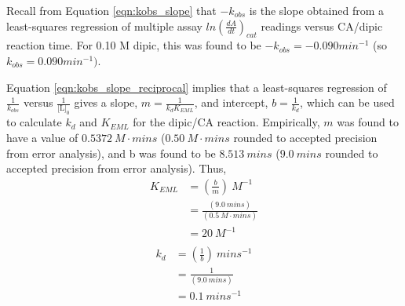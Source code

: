 Recall from Equation \eqref{eqn:kobs_slope} that $-k_{obs}$ is the slope obtained from a least-squares regression of multiple assay $ln \left(\frac{dA}{dt}\right)_{cat}$ readings versus CA/dipic reaction time. For 0.10 M dipic, this was found to be $-k_{obs}=-0.090 min^{-1}$ (so $k_{obs}=0.090 min^{-1})$.

Equation \eqref{eqn:kobs_slope_reciprocal} implies that a least-squares regression of $\frac{1}{k_{obs}}$ versus $\frac{1}{\text{[L]}_0}$ gives a slope, $m=\frac{1}{k_{d}K_{EML}}$, and intercept, $b=\frac{1}{k_{d}}$, which can be used to calculate $k_d$ and $K_{EML}$ for the dipic/CA reaction. Empirically, $m$ was found to have a value of $0.5372\ M\cdot{mins}$ ($0.50\ M\cdot{mins}$ rounded to accepted precision from error analysis), and b was found to be $8.513\ mins$ ($9.0\ mins$ rounded to accepted precision from error analysis). Thus,
\begin{equation}\label{eqn:samp_calc_keml}
\begin{split}
K_{EML}&=\left(\frac{b}{m}\right){\ }M^{-1}\\
&=\frac{\left (9.0{\ }mins\right )}{\left (0.5{\ }M\cdot{mins}\right )}\\
&=20\ M^{-1}\\
\end{split}
\end{equation}
\begin{equation}\label{eqn:samp_calc_kd}
\begin{split}
k_{d}&=\left(\frac{1}{b}\right){\ }mins^{-1}\\
&=\frac{1}{\left (9.0{\ }mins\right )}\\
&=0.1\ mins^{-1}\\
\end{split}
\end{equation}
